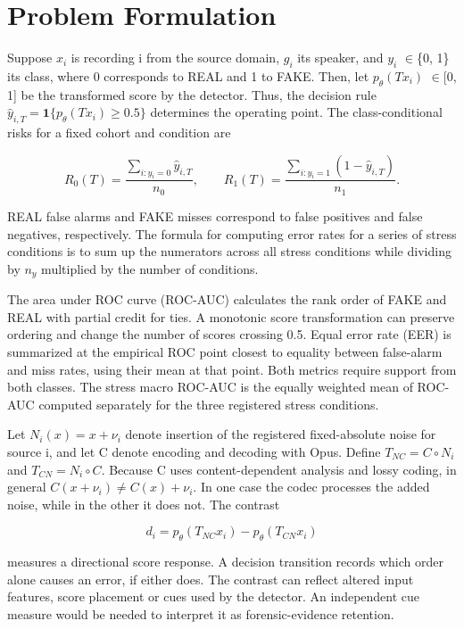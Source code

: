 \section{Problem Formulation}\label{sec:background}

Suppose \(x_i\) is recording i from the source domain, \(g_i\) its speaker, and \(y_i\) \ensuremath{\in}\{0, 1\} its class, where 0 corresponds to REAL and 1 to FAKE. Then, let \(p_\theta(Tx_i)\) \ensuremath{\in}[0, 1] be the transformed score by the detector. Thus, the decision rule \(\widehat{y}_{i,T}=\mathbf{1}\{p_\theta(Tx_i)\geq 0.5\}\) determines the operating point. The class-conditional risks for a fixed cohort and condition are

\begin{equation}
 R_0(T)=\frac{\sum_{i:y_i=0}\widehat{y}_{i,T}}{n_0},
 \qquad
 R_1(T)=\frac{\sum_{i:y_i=1}(1-\widehat{y}_{i,T})}{n_1}.
\end{equation}

REAL false alarms and FAKE misses correspond to false positives and false negatives, respectively. The formula for computing error rates for a series of stress conditions is to sum up the numerators across all stress conditions while dividing by \(n_y\) multiplied by the number of conditions.

The area under ROC curve (ROC-AUC) calculates the rank order of FAKE and REAL with partial credit for ties. A monotonic score transformation can preserve ordering and change the number of scores crossing 0.5. Equal error rate (EER) is summarized at the empirical ROC point closest to equality between false-alarm and miss rates, using their mean at that point. Both metrics require support from both classes. The stress macro ROC-AUC is the equally weighted mean of ROC-AUC computed separately for the three registered stress conditions.

Let \(N_i(x)=x+\nu_i\) denote insertion of the registered fixed-absolute noise for source i, and let C denote encoding and decoding with Opus. Define \(T_{NC}=C\circ N_i\) and \(T_{CN}=N_i\circ C\). Because C uses content-dependent analysis and lossy coding, in general \(C(x+\nu_i)\ne C(x)+\nu_i\). In one case the codec processes the added noise, while in the other it does not. The contrast

\begin{equation}
 d_i=p_\theta(T_{NC}x_i)-p_\theta(T_{CN}x_i)
\end{equation}

measures a directional score response. A decision transition records which order alone causes an error, if either does. The contrast can reflect altered input features, score placement or cues used by the detector. An independent cue measure would be needed to interpret it as forensic-evidence retention.

